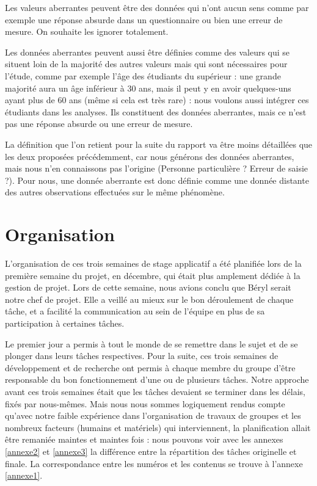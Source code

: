 \documentclass[a4paper,12pt]{article} %
\begin{document}
		    Les valeurs aberrantes peuvent être des données qui n'ont aucun sens comme par exemple une réponse absurde dans un questionnaire ou bien une erreur de mesure. On souhaite les ignorer totalement. 
		    
		    Les données aberrantes peuvent aussi être définies comme des valeurs qui se situent loin de la majorité des autres valeurs mais qui sont nécessaires pour l'étude, comme par exemple l'âge des étudiants du supérieur : une grande majorité aura un âge inférieur à 30 ans, mais il peut y en avoir quelques-uns ayant plus de 60 ans (même si cela est très rare) : nous voulons aussi intégrer ces étudiants dans les analyses. Ils constituent des données aberrantes, mais ce n'est pas une réponse absurde ou une erreur de mesure.
		    
		    La définition que l'on retient pour la suite du rapport va être moins détaillées que les deux proposées précédemment, car nous générons des données aberrantes, mais nous n'en connaissons pas l'origine (Personne particulière ? Erreur de saisie ?). Pour nous, une donnée aberrante est donc définie comme une donnée distante des autres observations effectuées sur le même phénomène.
		    
		    
	\section{Organisation}
	    L'organisation de ces trois semaines de stage applicatif a été planifiée lors de la première semaine du projet, en décembre, qui était plus amplement dédiée à la gestion de projet.
        Lors de cette semaine, nous avions conclu que Béryl serait notre chef de projet. Elle a veillé au mieux sur le bon déroulement de chaque tâche, et a facilité la communication au sein de l'équipe en plus de sa participation à certaines tâches.
    
        Le premier jour a permis à tout le monde de se remettre dans le sujet et de se plonger dans leurs tâches respectives. Pour la suite, ces trois semaines de développement et de recherche ont permis à chaque membre du groupe d'être responsable du bon fonctionnement d'une ou de plusieurs tâches. Notre approche avant ces trois semaines était que les tâches devaient se terminer dans les délais, fixés par nous-mêmes.
        Mais nous nous sommes logiquement rendus compte qu'avec notre faible expérience dans l'organisation de travaux de groupes et les nombreux facteurs (humains et matériels) qui interviennent, la planification allait être remaniée maintes et maintes fois : nous pouvons voir avec les annexes \ref{annexe2} et \ref{annexe3} la différence entre la répartition des tâches originelle et finale. La correspondance entre les numéros et les contenus se trouve à l'annexe \ref{annexe1}.
        
\end{document}

